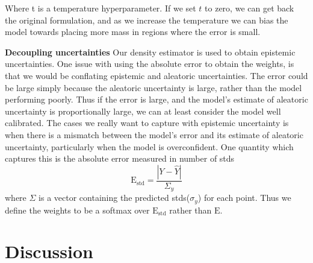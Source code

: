\documentclass[../main.tex]{subfiles}
\begin{document}
Where t is a temperature hyperparameter. If we set $t$ to zero, we can get back the original formulation, and as we increase the temperature we can bias the model towards placing more mass in regions where the error is small.

\textbf{Decoupling uncertainties} Our density estimator is used to obtain epistemic uncertainties. One issue with using the absolute error to obtain the weights, is that we would be conflating epistemic and aleatoric uncertainties. The error could be large simply because the aleatoric uncertainty is large, rather than the model performing poorly. Thus if the error is large, and the model's estimate of aleatoric uncertainty is proportionally large, we can at least consider the model well calibrated. The cases we really want to capture with epistemic uncertainty is when there is a mismatch between the model's error and its estimate of aleatoric uncertainty, particularly when the model is overconfident. One quantity which captures this is the absolute error measured in number of stds
\begin{equation}
    \mathrm{E_{std}} = \frac{|Y - \hat{Y}|}{\Sigma_y}
\end{equation}{}
 where $\Sigma$ is a vector containing the predicted stds($\sigma_y$) for each point. Thus we define the weights to be a softmax over $\mathrm{E_{std}}$ rather than $\mathrm{E}$. 
 
 
 \section{Discussion}
 
\end{document}
